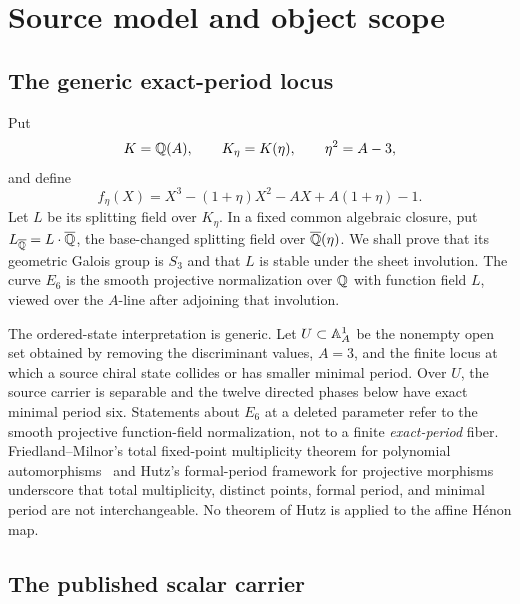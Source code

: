 \section{Source model and object scope}\label{sec:source}

\subsection{The generic exact-period locus}

Put
\[
 K=\mathbb Q(A),\qquad K_\eta=K(\eta),\qquad \eta^2=A-3,
\]
and define
\begin{equation}\label{eq:feta}
 f_\eta(X)
 =X^3-(1+\eta)X^2-AX+A(1+\eta)-1.
\end{equation}
Let $L$ be its splitting field over $K_\eta$.  In a fixed common algebraic
closure, put $L_{\overline{\mathbb Q}}=L\cdot\overline{\mathbb Q}$, the base-changed splitting field over
$\overline{\mathbb Q}(\eta)$.  We shall prove that its geometric Galois group is $S_3$ and
that $L$ is stable under the sheet involution.  The curve $E_6$ is the smooth
projective normalization over $\mathbb Q$ with function field $L$, viewed over the
$A$-line after adjoining that involution.

The ordered-state interpretation is generic.  Let
$U\subset\mathbb A^1_A$ be the nonempty open set obtained by removing the
discriminant values, $A=3$, and the finite locus at which a source chiral
state collides or has smaller minimal period.  Over $U$, the source carrier
is separable and the twelve directed phases below have exact minimal period
six.  Statements about $E_6$ at a deleted parameter refer to the smooth
projective function-field normalization, not to a finite \emph{exact-period}
fiber.  Friedland--Milnor's total fixed-point multiplicity theorem for
polynomial automorphisms~\cite[Thm.~3.1 and Lem.~3.2]{friedlandmilnor1989}
and Hutz's formal-period framework for projective morphisms
\cite[Def.~1.1, Thm.~3.1, and Prop.~4.1(2)]{hutz2010} underscore that total
multiplicity, distinct points, formal period, and minimal period are not
interchangeable.  No theorem of Hutz is applied to the affine H\'enon map.

\subsection{The published scalar carrier}

